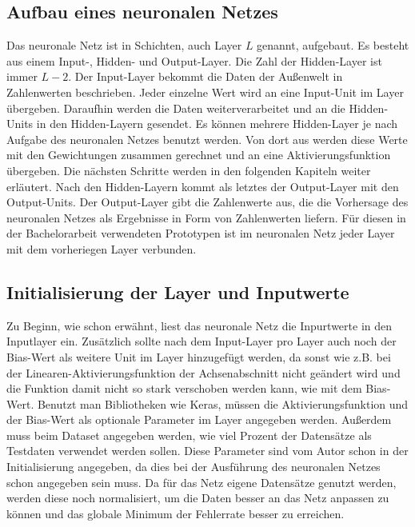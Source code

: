 \subsection{Aufbau eines neuronalen Netzes}
Das neuronale Netz ist in Schichten, auch Layer \(L\) genannt, aufgebaut. Es besteht aus einem Input-, Hidden- und Output-Layer. Die Zahl der Hidden-Layer ist immer \(L - 2\). Der Input-Layer bekommt die Daten der Außenwelt in Zahlenwerten beschrieben. Jeder einzelne Wert wird an eine Input-Unit im Layer übergeben. Daraufhin werden die Daten weiterverarbeitet und an die Hidden-Units in den Hidden-Layern gesendet. Es können mehrere Hidden-Layer je nach Aufgabe des neuronalen Netzes benutzt werden. Von dort aus werden diese Werte mit den Gewichtungen zusammen gerechnet und an eine Aktivierungsfunktion übergeben. Die nächsten Schritte werden in den folgenden Kapiteln weiter erläutert. Nach den Hidden-Layern kommt als letztes der Output-Layer mit den Output-Units. Der Output-Layer gibt die Zahlenwerte aus, die die Vorhersage des neuronalen Netzes als Ergebnisse in Form von Zahlenwerten liefern. Für diesen in der Bachelorarbeit verwendeten Prototypen ist im neuronalen Netz jeder Layer mit dem vorheriegen Layer verbunden. 

\subsection{Initialisierung der Layer und Inputwerte}
Zu Beginn, wie schon erwähnt, liest das neuronale Netz die Inpurtwerte in den Inputlayer ein. Zusätzlich sollte nach dem Input-Layer pro Layer auch noch der Bias-Wert als weitere Unit im Layer hinzugefügt werden, da sonst wie z.B. bei der Linearen-Aktivierungsfunktion der Achsenabschnitt nicht geändert wird und die Funktion damit nicht so stark verschoben werden kann, wie mit dem Bias-Wert. 
\newline
Benutzt man Bibliotheken wie Keras, müssen die Aktivierungsfunktion und der Bias-Wert als optionale Parameter im Layer angegeben werden. Außerdem muss beim Dataset angegeben werden, wie viel Prozent der Datensätze als Testdaten verwendet werden sollen. Diese Parameter sind vom Autor schon in der Initialisierung angegeben, da dies bei der Ausführung des neuronalen Netzes schon angegeben sein muss. 
\newline
Da für das Netz eigene Datensätze genutzt werden, werden diese noch normalisiert, um die Daten besser an das Netz anpassen zu können und das globale Minimum der Fehlerrate besser zu erreichen. 

